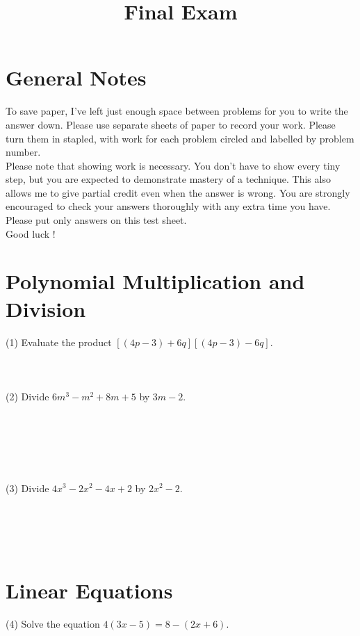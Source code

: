 \documentclass{article}
\title{Final Exam}
\date{}
\begin{document}
\maketitle

\section{General Notes}
To save paper, I've left just enough space between problems for you to write the answer down. Please use separate sheets of paper to record your work. Please turn them in stapled, with work for each problem circled and labelled by problem number. \\

Please note that showing work is necessary. You don't have to show every tiny step, but you are expected to demonstrate mastery of a technique. This also allows me to give partial credit even when the answer is wrong. You are strongly encouraged to check your answers thoroughly with any extra time you have. Please put only answers on this test sheet.\\

Good luck !

\section{Polynomial Multiplication and Division}

(1) Evaluate the product $[(4p-3)+ 6q][(4p-3) -6q]$.\\\\\\\\






(2) Divide $6m^3-m^2+8m + 5$ by $3m-2$.\\\\\\\\\\\

(3) Divide $4x^3-2x^2-4x + 2$ by $2x^2-2$.\\\\\\\\\

\section{Linear Equations}

(4) Solve the equation $4(3x-5) = 8 - (2x + 6)$.\\\\\\\\\\\
\end{document}
